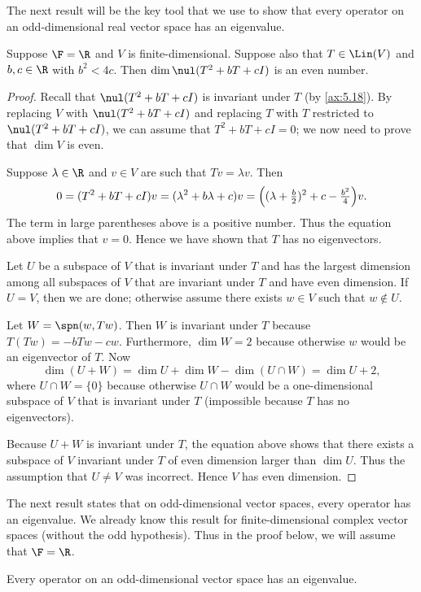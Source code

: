The next result will be the key tool that we use to show that every operator
on an odd-dimensional real vector space has an eigenvalue.

\begin{result}\label{ax:5.33}
Suppose $\F=\R$ and $V$ is finite-dimensional. Suppose also that
$T\in\Lin(V)$ and $b,c\in\R$ with $b^2<4c$. Then $\dim\nul(T^2+bT+cI)$ is an
even number.
\end{result}

\begin{proof}
Recall that $\nul(T^2+bT+cI)$ is invariant under $T$ (by \ref{ax:5.18}). By
replacing $V$ with $\nul(T^2+bT+cI)$ and replacing $T$ with $T$ restricted to
$\nul(T^2+bT+cI)$, we can assume that $T^2+bT+cI=0$; we now need to prove
that $\dim V$ is even.

Suppose $\lambda\in\R$ and $v\in V$ are such that $Tv=\lambda v$. Then
\[ 0=(T^2+bT+cI)v=(\lambda^2+b\lambda+c)v
    =\Bigl((\lambda+\tfrac{b}{2})^2+c-\tfrac{b^2}{4}\Bigr)v. \]
The term in large parentheses above is a positive number. Thus the equation
above implies that $v=0$. Hence we have shown that $T$ has no eigenvectors.

Let $U$ be a subspace of $V$ that is invariant under $T$ and has the largest
dimension among all subspaces of $V$ that are invariant under $T$ and have
even dimension. If $U=V$, then we are done; otherwise assume there exists
$w\in V$ such that $w\notin U$.

Let $W=\spn(w,Tw)$. Then $W$ is invariant under $T$ because
$T(Tw)=-bTw-cw$. Furthermore, $\dim W=2$ because otherwise $w$ would be an
eigenvector of $T$. Now
\[ \dim(U+W)=\dim U+\dim W-\dim(U\cap W)=\dim U+2, \]
where $U\cap W=\{0\}$ because otherwise $U\cap W$ would be a one-dimensional
subspace of $V$ that is invariant under $T$ (impossible because $T$ has no
eigenvectors).

Because $U+W$ is invariant under $T$, the equation above shows that there
exists a subspace of $V$ invariant under $T$ of even dimension larger than
$\dim U$. Thus the assumption that $U\ne V$ was incorrect. Hence $V$ has even
dimension.
\end{proof}

The next result states that on odd-dimensional vector spaces, every operator
has an eigenvalue. We already know this result for finite-dimensional complex
vector spaces (without the odd hypothesis). Thus in the proof below, we will
assume that $\F=\R$.

\begin{result}\label{ax:5.34}
Every operator on an odd-dimensional vector space has an eigenvalue.
\end{result}

